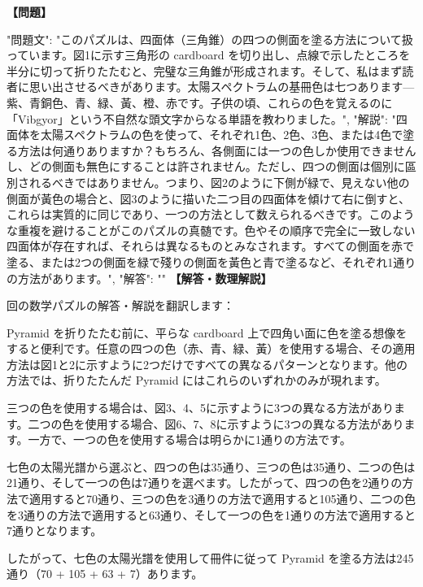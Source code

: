 \documentclass[10pt,a4paper,oneside,openany]{ltjsbook}
\begin{document}
\begin{tcolorbox}[colback=softblue,colframe=primaryblue,title=\textbf{第 281 問：PAINTING A PYRAMID.},arc=2mm,boxrule=1pt,breakable]
\textbf{【問題】}\par\vspace{0.3em}
{
"問題文": "このパズルは、四面体（三角錐）の四つの側面を塗る方法について扱っています。図1に示す三角形の cardboard を切り出し、点線で示したところを半分に切って折りたたむと、完璧な三角錐が形成されます。そして、私はまず読者に思い出させるべきがあります。太陽スペクトラムの基冊色は七つあります—紫、青銅色、青、緑、黃、橙、赤です。子供の頃、これらの色を覚えるのに「Vibgyor」という不自然な頭文字からなる単語を教わりました。",
"解説": "四面体を太陽スペクトラムの色を使って、それぞれ1色、2色、3色、または4色で塗る方法は何通りありますか？もちろん、各側面には一つの色しか使用できませんし、どの側面も無色にすることは許されません。ただし、四つの側面は個別に區別されるべきではありません。つまり、図2のように下側が緑で、見えない他の側面が黃色の場合と、図3のように描いた二つ目の四面体を傾けて右に倒すと、これらは実質的に同じであり、一つの方法として数えられるべきです。このような重複を避けることがこのパズルの真髄です。色やその順序で完全に一致しない四面体が存在すれば、それらは異なるものとみなされます。すべての側面を赤で塗る、または2つの側面を緑で殘りの側面を黃色と青で塗るなど、それぞれ1通りの方法があります。",
"解答": ""
}
\tcblower
\textbf{【解答・数理解説】}\par\vspace{0.3em}
回の数学パズルの解答・解説を翻訳します：

 Pyramid を折りたたむ前に、平らな cardboard 上で四角い面に色を塗る想像をすると便利です。任意の四つの色（赤、青、緑、黃）を使用する場合、その適用方法は図1と2に示すように2つだけですべての異なるパターンとなります。他の方法では、折りたたんだ Pyramid にはこれらのいずれかのみが現れます。

三つの色を使用する場合は、図3、4、5に示すように3つの異なる方法があります。二つの色を使用する場合、図6、7、8に示すように3つの異なる方法があります。一方で、一つの色を使用する場合は明らかに1通りの方法です。

七色の太陽光譜から選ぶと、四つの色は35通り、三つの色は35通り、二つの色は21通り、そして一つの色は7通りを選べます。したがって、四つの色を2通りの方法で適用すると70通り、三つの色を3通りの方法で適用すると105通り、二つの色を3通りの方法で適用すると63通り、そして一つの色を1通りの方法で適用すると7通りとなります。

したがって、七色の太陽光譜を使用して冊件に従って Pyramid を塗る方法は245通り（70 + 105 + 63 + 7）あります。
\end{tcolorbox}
\end{document}
